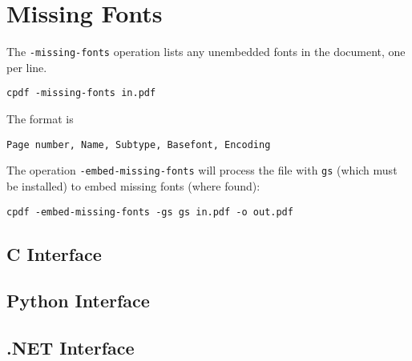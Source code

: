 \documentclass{book}
\begin{document}
\section{Missing Fonts}
  The \verb!-missing-fonts! operation lists any unembedded fonts in the document, one per line.
  \begin{framed}
  \small\noindent\verb!cpdf -missing-fonts in.pdf!
  \end{framed}

  \noindent The format is
  \begin{framed}
  \small\noindent\verb!Page number, Name, Subtype, Basefont, Encoding!
  \end{framed}

\noindent The operation \texttt{-embed-missing-fonts} will process the file with \texttt{gs} (which must be installed) to embed missing fonts (where found):

  \begin{framed}
  \small\noindent\verb!cpdf -embed-missing-fonts -gs gs in.pdf -o out.pdf!
  \end{framed}

\label{listmisingfonts}\clearpage\pagestyle{empty}

\begin{cpdflib}
\clearpage
\section*{C Interface}
\begin{small}\tt

\end{small}
\end{cpdflib}

\begin{pycpdflib}
\clearpage
\section*{Python Interface}
\begin{small}\tt

\end{small}
\end{pycpdflib}

\begin{dotnetcpdflib}
\clearpage
\section*{.NET Interface}
\begin{small}\tt

\end{small}
\end{dotnetcpdflib}
\end{document}

